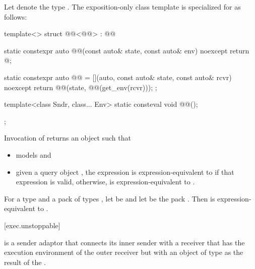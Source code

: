 \pnum
Let  denote the type .
The exposition-only class template 
is specialized for  as follows:
\begin{codeblock}
template<>
struct @@<@@> : @@ {
  static constexpr auto @@(const auto& state, const auto& env) noexcept {
    return @\seebelow@;
  }

  static constexpr auto @@ =
    [](auto, const auto& state, const auto& rcvr) noexcept {
      return @@(state, @@(get_env(rcvr)));
    };

  template<class Sndr, class... Env>
    static consteval void @@();
};
\end{codeblock}

\pnum
Invocation of
returns an object  such that
\begin{itemize}
\item
{} models  and
\item
given a query object ,
the expression  is expression-equivalent
to  if that expression is valid,
otherwise,  is expression-equivalent
to .
\end{itemize}

\pnum
For a type  and a pack of types ,
let  be  and
let  be the pack
.
Then 
is expression-equivalent to
.

[exec.unstoppable]{}

\pnum
{} is a sender adaptor
that connects its inner sender
with a receiver that has the execution environment of the outer receiver
but with an object of type 
as the result of the .

